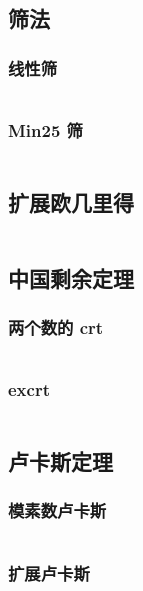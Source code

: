 \documentclass[a4paper, twoside]{article}
\begin{document}
\begin{multicols}{2}
			\subsection{筛法}
				\subsubsection{线性筛}
					\inputminted{cpp}{../src-midori/number/线性筛.cpp}
				\subsubsection{Min25 筛}
					\inputminted{cpp}{../src-midori/number/min25.cpp}

			\subsection{扩展欧几里得}
				\inputminted{cpp}{../src-midori/number/exgcd.cpp}

			\subsection{中国剩余定理}
				\subsubsection{两个数的 crt}
					\inputminted{cpp}{../src-midori/number/两个数的crt.cpp}
				\subsubsection{excrt}
					\inputminted{cpp}{../src-midori/number/excrt.cpp}
			
			\subsection{卢卡斯定理}
				\subsubsection{模素数卢卡斯}
					\inputminted{cpp}{../src-midori/number/lucas.cpp}
				\subsubsection{扩展卢卡斯}
					\inputminted{cpp}{../src-midori/number/exlucas.cpp}
			

\end{multicols}
\end{document}
